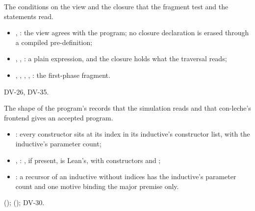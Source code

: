 \begin{definition}
  \label{def:EraseProof-ViewAgrees}
  \leanok
   The conditions on the view and the closure that the fragment test and the statements read.
  \begin{itemize}
  \item {}, : the view agrees with the program; no closure declaration is erased through a compiled pre-definition;
  \item {}, , : a plain expression, and the closure holds what the traversal reads;
  \item {}, , , , : the first-phase fragment.
  \end{itemize}
   DV-26, DV-35.
\end{definition}

\begin{definition}
  \label{def:EraseProof-CtorsListed}
  \leanok
   The shape of the program's records that the simulation reads and that con-leche's frontend gives an accepted program.
  \begin{itemize}
  \item {}: every constructor sits at its index  in its inductive's constructor list, with the inductive's parameter count;
  \item {}, : , if present, is Lean's, with constructors  and ;
  \item {}: a recursor of an inductive without indices has the inductive's parameter count and one motive binding the major premise only.
  \end{itemize}
    ();  (); DV-30.
\end{definition}

